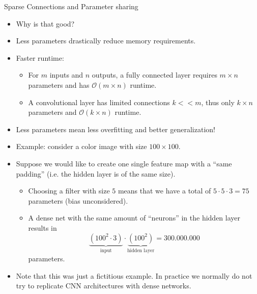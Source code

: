 \begin{vbframe}{Sparse Connections and Parameter sharing}
  \begin{itemize}
    \item Why is that good?
    \item Less parameters drastically reduce memory requirements.
    \item Faster runtime:
    \begin{itemize}
      \item For $m$ inputs and $n$ outputs, a fully connected layer requires $m\times n$ parameters and has $\mathcal{O}(m\times n)$ runtime.
      \item A convolutional layer has limited connections $k<<m$, thus only $k\times n$ parameters and $\mathcal{O}(k\times n)$ runtime.
    \end{itemize}
    \item Less parameters mean less overfitting and better generalization!
  \end{itemize}
\framebreak
  \begin{itemize}
    \item Example: consider a color image with size $100 \times 100$.
    \item Suppose we would like to create one single feature map with a \enquote{same padding} (i.e. the hidden layer is of the same size).
    \begin{itemize}
      \item Choosing a filter with size $5$ means that we have a total of $5 \cdot 5 \cdot 3 = 75$ parameters (bias unconsidered).
      \item A dense net with the same amount of \enquote{neurons} in the hidden layer results in 
      $$\underbrace{(100^2 \cdot 3)}_{\text{input}} \cdot \underbrace{(100^2)}_{\text{hidden layer}} = 300.000.000 $$ parameters.
      
      
    \end{itemize}
  \item Note that this was just a fictitious example. In practice we normally do not try to replicate CNN architectures with dense networks.
  \end{itemize}
\end{vbframe}

